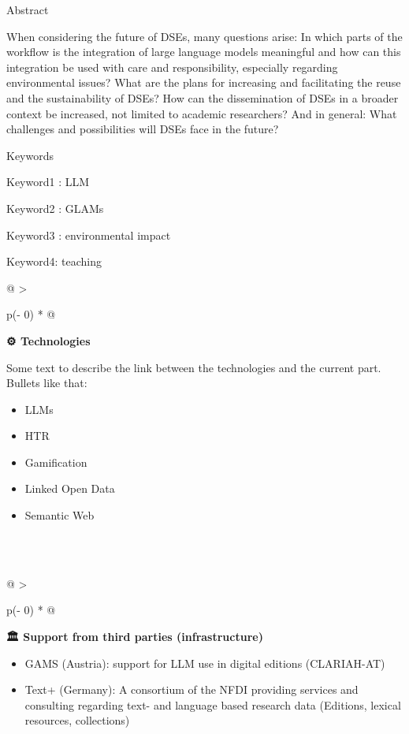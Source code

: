 \documentclass[
  letterpaper,
  DIV=11,
  numbers=noendperiod]{scrreprt}
\begin{document}
Abstract

When considering the future of DSEs, many questions arise: In which
parts of the workflow is the integration of large language models
meaningful and how can this integration be used with care and
responsibility, especially regarding environmental issues? What are the
plans for increasing and facilitating the reuse and the sustainability
of DSEs? How can the dissemination of DSEs in a broader context be
increased, not limited to academic researchers? And in general: What
challenges and possibilities will DSEs face in the future?

Keywords

Keyword1 : LLM

Keyword2 : GLAMs

Keyword3 : environmental impact

Keyword4: teaching

\begin{longtable}[]{@{}
  >{\raggedright\arraybackslash}p{(\columnwidth - 0\tabcolsep) * }@{}}
\toprule\noalign{}
\begin{minipage}[b]{\linewidth}\raggedright
\textbf{⚙️ Technologies} \textbar{}

Some text to describe the link between the technologies and the current
part. Bullets like that:

\begin{itemize}
\item
  LLMs
\item
  HTR
\item
  Gamification
\item
  Linked Open Data
\item
  Semantic Web
\end{itemize}
\end{minipage} \\
\midrule\noalign{}
\endhead
\bottomrule\noalign{}
\endlastfoot
 \\
\end{longtable}

\begin{longtable}[]{@{}
  >{\raggedright\arraybackslash}p{(\columnwidth - 0\tabcolsep) * }@{}}
\toprule\noalign{}
\begin{minipage}[b]{\linewidth}\raggedright
\textbf{🏛️ Support from third parties (infrastructure)} \textbar{}

\begin{itemize}
\item
  GAMS (Austria): support for LLM use in digital editions (CLARIAH-AT)
\item
  Text+ (Germany): A consortium of the NFDI providing services and
  consulting regarding text- and language based research data (Editions,
  lexical resources, collections)
\end{itemize}
\end{minipage} \\
\midrule\noalign{}
\endhead
\bottomrule\noalign{}
\endlastfoot
 \\
\end{longtable}
\end{document}

